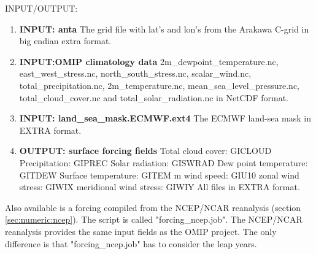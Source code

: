 INPUT/OUTPUT:
\begin{enumerate}

\item \textbf{INPUT: anta} \newline
The grid file with lat's  and lon's from the Arakawa C-grid
in big endian extra format.

\item \textbf{INPUT:OMIP climatology data} \newline
2m\_dewpoint\_temperature.nc,
east\_west\_stress.nc,
north\_south\_stress.nc,
scalar\_wind.nc,
total\_precipitation.nc,
2m\_temperature.nc,
mean\_sea\_level\_pressure.nc,
total\_cloud\_cover.nc and
total\_solar\_radiation.nc 
in NetCDF format. 

\item \textbf{INPUT: land\_sea\_mask.ECMWF.ext4} \newline
The ECMWF land-sea mask in EXTRA format. 

\item \textbf{OUTPUT: surface forcing fields} \newline
Total cloud cover: GICLOUD \newline
Precipitation: GIPREC \newline
Solar radiation: GISWRAD \newline
Dew point temperature: GITDEW \newline
Surface temperature: GITEM  m wind speed: GIU10 \newline
zonal wind stress: GIWIX \newline
meridional wind stress: GIWIY \newline
All files in EXTRA format.
\end{enumerate}

Also available is a forcing compiled from the NCEP/NCAR reanalysis (section \ref{sec:numeric:ncep}).
The script is called "forcing\_ncep.job". The NCEP/NCAR reanalysis provides the same input fields as the 
OMIP project. The only difference is that "forcing\_ncep.job" has to consider the leap years.

